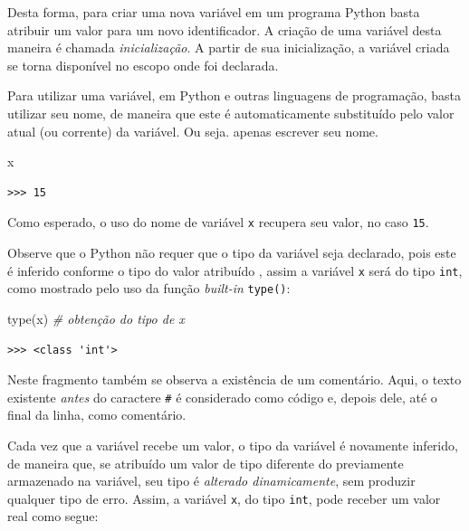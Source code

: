 \documentclass[
]{book}
\newenvironment{Shaded}{\begin{snugshade}}{\end{snugshade}}
\newcommand{\BuiltInTok}[1]{#1}
\newcommand{\CommentTok}[1]{\textcolor[rgb]{0.56,0.35,0.01}{\textit{#1}}}
\newcommand{\NormalTok}[1]{#1}
\begin{document}
Desta forma, para criar uma nova variável em um programa Python basta atribuir um valor para um novo identificador. A criação de uma variável desta maneira é chamada \emph{inicialização}. A partir de sua inicialização, a variável criada se torna disponível no escopo onde foi declarada.

Para utilizar uma variável, em Python e outras linguagens de programação, basta utilizar seu nome, de maneira que este é automaticamente substituído pelo valor atual (ou corrente) da variável. Ou seja. apenas escrever seu nome.

\begin{Shaded}
\begin{Highlighting}[]
\NormalTok{x}
\end{Highlighting}
\end{Shaded}

\begin{verbatim}
>>> 15
\end{verbatim}

Como esperado, o uso do nome de variável \texttt{x} recupera seu valor, no caso \texttt{15}.

Observe que o Python não requer que o tipo da variável seja declarado, pois este é inferido conforme o tipo do valor atribuído , assim a variável \texttt{x} será do tipo \texttt{int}, como mostrado pelo uso da função \emph{built-in} \texttt{type()}:

\begin{Shaded}
\begin{Highlighting}[]
\BuiltInTok{type}\NormalTok{(x) }\CommentTok{\# obtenção do tipo de x}
\end{Highlighting}
\end{Shaded}

\begin{verbatim}
>>> <class 'int'>
\end{verbatim}

Neste fragmento também se observa a existência de um comentário. Aqui, o texto existente \emph{antes} do caractere \texttt{\#} é considerado como código e, depois dele, até o final da linha, como comentário.

Cada vez que a variável recebe um valor, o tipo da variável é novamente inferido, de maneira que, se atribuído um valor de tipo diferente do previamente armazenado na variável, seu tipo é \emph{alterado dinamicamente}, sem produzir qualquer tipo de erro. Assim, a variável \texttt{x}, do tipo \texttt{int}, pode receber um valor real como segue:
\end{document}
